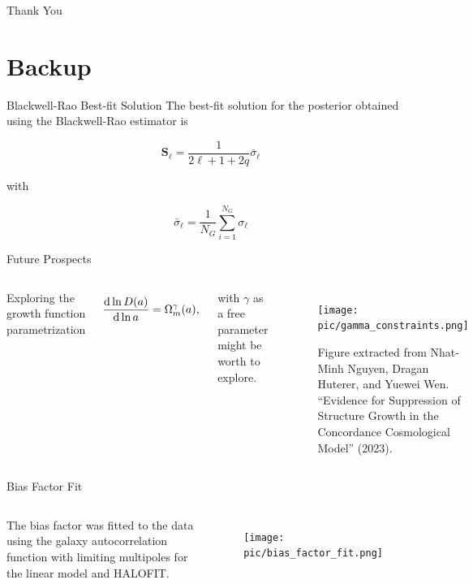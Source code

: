 \documentclass[serif, aspectratio=169]{beamer}
\begin{document}
\begin{frame}
    \begin{center}
        {\Huge\calligra Thank You}
    \end{center}
\end{frame}

\section*{Backup}

\begin{frame}{Blackwell-Rao Best-fit Solution}
	The best-fit solution for the posterior obtained using the Blackwell-Rao estimator is
	
	\begin{equation}
		\mathbf{S}_\ell=\frac{1}{2\ell+1+2q}\bar{\sigma}_\ell
	\end{equation}
	
	with
	
	\begin{equation}
		\bar{\sigma}_\ell=\frac{1}{N_G}\sum_{i=1}^{N_G}\sigma_\ell
	\end{equation}
\end{frame}

\begin{frame}{Future Prospects}
	\begin{columns}
	
	Exploring the growth function parametrization 

    \begin{equation}\label{growth_func_new}
		\dv{\ln{D(a)}}{\ln{a}}=\Omega_m^\gamma (a),
	\end{equation}
	
	with $\gamma$ as a free parameter might be worth to explore.
	
	
	\begin{figure}
	\centering
	\texttt{[image: pic/gamma\_constraints.png]}
	\caption{Figure extracted from Nhat-Minh Nguyen, Dragan Huterer, and Yuewei Wen. “Evidence for Suppression of Structure Growth in the Concordance Cosmological Model” (2023).}
	\label{fig:gamma_par}	
	\end{figure}
	\end{columns}
\end{frame}

\begin{frame}{Bias Factor Fit}
	\begin{columns}
	\column{0.5\linewidth}
	The bias factor was fitted to the data using the galaxy autocorrelation function with limiting multipoles for the linear model and HALOFIT.
	\column{0.5\linewidth}
	\begin{figure}
	\centering
	\texttt{[image: pic/bias\_factor\_fit.png]}
	\end{figure}
	\end{columns}
\end{frame}
\end{document}
